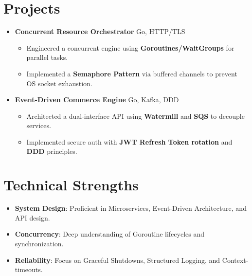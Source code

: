 \documentclass[letterpaper,11pt]{article}
\begin{document}
\section{Projects}
\begin{itemize}[leftmargin=0.15in, label={}]
    \item 
    \textbf{\small Concurrent Resource Orchestrator} \hfill \small Go, HTTP/TLS \\
    \begin{itemize}[nosep, leftmargin=1.5em]
      \item \small{Engineered a concurrent engine using \textbf{Goroutines/WaitGroups} for parallel tasks.}
      \item \small{Implemented a \textbf{Semaphore Pattern} via buffered channels to prevent OS socket exhaustion.}
    \end{itemize}
    
    \vspace{2pt}
    
    \item 
    \textbf{\small Event-Driven Commerce Engine} \hfill \small Go, Kafka, DDD \\
    \begin{itemize}[nosep, leftmargin=1.5em]
      \item \small{Architected a dual-interface API using \textbf{Watermill} and \textbf{SQS} to decouple services.}
      \item \small{Implemented secure auth with \textbf{JWT Refresh Token rotation} and \textbf{DDD} principles.}
    \end{itemize}
\end{itemize}

\section{Technical Strengths}
\begin{itemize}[leftmargin=0.15in, label={}, nosep]
    \item \small{\textbf{System Design}: Proficient in Microservices, Event-Driven Architecture, and API design.}
    \item \small{\textbf{Concurrency}: Deep understanding of Goroutine lifecycles and synchronization.}
    \item \small{\textbf{Reliability}: Focus on Graceful Shutdowns, Structured Logging, and Context-timeouts.}
\end{itemize}
\end{document}
